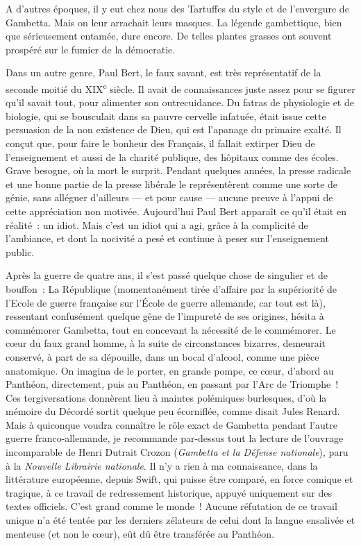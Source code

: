 \documentclass[french,twoside]{book} %
\begin{document}
A d’autres époques, il y eut chez nous des Tartuffes du style et de l’envergure de Gambetta. Mais on leur arrachait leurs masques. La légende gambettique, bien que sérieusement entamée, dure encore. De telles plantes grasses ont souvent prospéré sur le fumier de la démocratie.\par
Dans un autre genre, Paul Bert, le faux savant, est très représentatif de la seconde moitié du XIX\textsuperscript{e} siècle. Il avait de connaissances juste assez pour se figurer qu’il savait tout, pour alimenter son outrecuidance. Du fatras de physiologie et de biologie, qui se bousculait dans sa pauvre cervelle infatuée, était issue cette persuasion de la non existence de Dieu, qui est l’apanage du primaire exalté. Il conçut que, pour faire le bonheur des Français, il fallait extirper Dieu de l’enseignement et aussi de la charité publique, des hôpitaux comme des écoles. Grave besogne, où la mort le surprit. Pendant quelques années, la presse radicale et une bonne partie de la presse libérale le représentèrent comme une sorte de génie, sans alléguer d’ailleurs — et pour cause — aucune preuve à l’appui de cette appréciation non motivée. Aujourd’hui Paul Bert apparaît ce qu’il était en réalité : un idiot. Mais c’est un idiot qui a agi, grâce à la complicité de l’ambiance, et dont la nocivité a pesé et continue à peser sur l’enseignement public.\par
Après la guerre de quatre ans, il s’est passé quelque chose de singulier et de bouffon : La République (momentanément tirée d’affaire par la supériorité de l’Ecole de guerre française sur l’École de guerre allemande, car tout est là), ressentant confusément quelque gêne de l’impureté de ses origines, hésita à commémorer Gambetta, tout en concevant la nécessité de le commémorer. Le cœur du faux grand homme, à la suite de circonstances bizarres, demeurait conservé, à part de sa dépouille, dans un bocal d’alcool, comme une pièce anatomique. On imagina de le porter, en grande pompe, ce cœur, d’abord au Panthéon, directement, puis au Panthéon, en passant par l’Arc de Triomphe ! Ces tergiversations donnèrent lieu à maintes polémiques burlesques, d’où la mémoire du Décordé sortit quelque peu écorniflée, comme disait Jules Renard. Mais à quiconque voudra connaître le rôle exact de Gambetta pendant l’autre guerre franco-allemande, je recommande par-dessus tout la lecture de l’ouvrage incomparable de Henri Dutrait Crozon ({\itshape Gambetta et la Défense nationale}), paru à la {\itshape Nouvelle Librairie nationale}. Il n’y a rien à ma connaissance, dans la littérature européenne, depuis Swift, qui puisse être comparé, en force comique et tragique, à ce travail de redressement historique, appuyé uniquement sur des textes officiels. C’est grand comme le monde ! Aucune réfutation de ce travail unique n’a été tentée par les derniers zélateurs de celui dont la langue ensalivée et menteuse (et non le cœur), eût dû être transférée au Panthéon.\par
\end{document}
